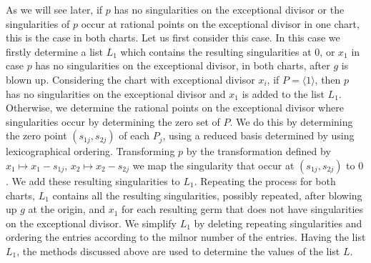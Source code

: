 \documentclass[noend]{amsproc}
\theoremstyle{definition}
\begin{document}
As we will see later, if $p$ has no singularities on the exceptional divisor or the
singularities of $p$ occur at rational points on the exceptional divisor in one
chart, this is the case in both charts. Let us first consider this case.
In this case we firstly determine a list $L_1$ which contains the resulting
singularities at $0$, or $x_1$ in case $p$ has no singularities on the exceptional divisor, 
in both charts, after $g$ is blown up. Considering the chart with
exceptional divisor $x_i$, if $P=\langle 1\rangle$, then $p$ has no singularities on the
exceptional divisor and $x_1$ is added to the list $L_1$. Otherwise, we determine the
rational points on the exceptional divisor where singularities occur by
determining the zero set of $P$. We do this by determining the zero point
$(s_{1j},s_{2j})$ of each $P_j$, using a reduced basis determined by using
lexicographical ordering. Transforming $p$ by the transformation defined by
$x_1\mapsto x_1-s_{1j}$, $x_2\mapsto x_2-s_{2j}$ we map the singularity that
occur at  $(s_{1j},s_{2j})$ to $0$. We add these resulting singularities to
$L_1$. Repeating the process for both charts, $L_1$ contains all the resulting
singularities, possibly repeated, after blowing up $g$ at the origin, and $x_1$
for each resulting germ that does not have singularities on the exceptional divisor. We
simplify $L_1$ by deleting repeating singularities and ordering the entries
according to the milnor number of the entries. Having the list $L_1$, the
methods discussed above are used to determine the values of the list $L$.
\end{document}
